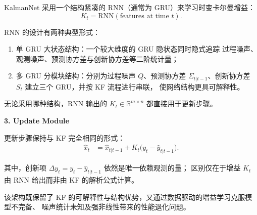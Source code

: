 \documentclass{article}
\begin{document}
KalmanNet 采用一个结构紧凑的 RNN（通常为 GRU）来学习时变卡尔曼增益：
\[
K_t = \mathrm{RNN}(\text{features at time } t).
\]

RNN 的设计有两种典型形式：
\begin{enumerate}
    \item 单 GRU 大状态结构：一个较大维度的 GRU 隐状态同时隐式追踪
          过程噪声、观测噪声、预测协方差与创新协方差等二阶统计量；
    \item 多 GRU 分模块结构：分别为过程噪声 $Q$、预测协方差
          $\Sigma_{t|t-1}$、创新协方差 $S_t$ 建立三个 GRU，并按 KF 流程进行串联，
          使网络结构更具可解释性。
\end{enumerate}

无论采用哪种结构，RNN 输出的 $K_t \in \mathbb{R}^{m \times n}$ 都直接用于更新步骤。

\textbf{3. Update Module}

更新步骤保持与 KF 完全相同的形式：
\begin{align}
    \hat{x}_{t} &= 
    \hat{x}_{t|t-1} + K_t \bigl(y_t - \hat{y}_{t|t-1}\bigr).
\end{align}

其中，创新项 $\Delta y_t = y_t - \hat{y}_{t|t-1}$ 依然是唯一依赖观测的量；
区别仅在于增益 $K_t$ 由 RNN 给出而非由 KF 的解析公式计算。

该架构既保留了 KF 的可解释性与结构优势，又通过数据驱动的增益学习克服模型不完备、
噪声统计未知及强非线性带来的性能退化问题。
\end{document}
